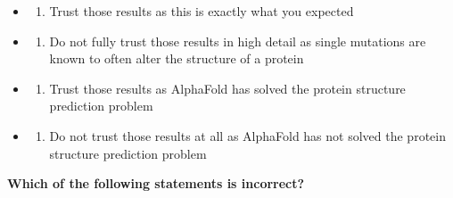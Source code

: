 \documentclass[
]{scrbook}
\providecommand{\tightlist}{%
  \setlength{\itemsep}{0pt}\setlength{\parskip}{0pt}}\usepackage{longtable,booktabs,array}
\begin{document}
\begin{itemize}
\tightlist
\item
  \begin{enumerate}
  \def\labelenumi{(\Alph{enumi})}
  \tightlist
  \item
    Trust those results as this is exactly what you expected\\
  \end{enumerate}
\item
  \begin{enumerate}
  \def\labelenumi{(\Alph{enumi})}
  \setcounter{enumi}{1}
  \tightlist
  \item
    Do not fully trust those results in high detail as single mutations
    are known to often alter the structure of a protein\\
  \end{enumerate}
\item
  \begin{enumerate}
  \def\labelenumi{(\Alph{enumi})}
  \setcounter{enumi}{2}
  \tightlist
  \item
    Trust those results as AlphaFold has solved the protein structure
    prediction problem\\
  \end{enumerate}
\item
  \begin{enumerate}
  \def\labelenumi{(\Alph{enumi})}
  \setcounter{enumi}{3}
  \tightlist
  \item
    Do not trust those results at all as AlphaFold has not solved the
    protein structure prediction problem
  \end{enumerate}
\end{itemize}

\textbf{Which of the following statements is incorrect?}
\end{document}
